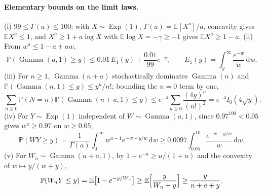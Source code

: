 \documentclass[11pt,a4paper]{article}
\theoremstyle{plain}
\theoremstyle{definition}
\theoremstyle{remark}
\newcommand{\Prob}{\mathbb P}
\newcommand{\E}{\mathbb E}
\newcommand{\dd}{\,\mathrm d}
\DeclareMathOperator{\Gam}{Gamma}
\DeclareMathOperator{\Ex}{Exp}
\begin{document}
\paragraph{Elementary bounds on the limit laws.} (i) $99\le\Gamma(a)\le100$: with $X\sim\Ex(1)$, $\Gamma(a)=\E[X^a]/a$, concavity gives $\E X^a\le1$, and $X^a\ge1+a\log X$ with $\E\log X=-\gamma\ge-1$ gives $\E X^a\ge1-a$. (ii) From $w^a\le1-a+aw$,
\begin{equation}\label{eq:blankup}
\Prob(\Gam(a,1)\ge y)\le0.01\,E_1(y)+\frac{0.01}{99}e^{-y},\qquad E_1(y)=\int_y^\infty\frac{e^{-w}}{w}\dd w.
\end{equation}
(iii) For $n\ge1$, $\Gam(n+a)$ stochastically dominates $\Gam(n)$ and $\Prob(\Gam(n,1)\le y)\le y^n/n!$; bounding the $n=0$ term by one,
\begin{equation}\label{eq:missup}
\sum_{n\ge0}\Prob(N=n)\Prob(\Gam(n+a,1)\le y)\le e^{-4}\sum_{n\ge0}\frac{(4y)^n}{(n!)^2}=e^{-4}I_0(4\sqrt y).
\end{equation}
(iv) For $Y\sim\Ex(1)$ independent of $W\sim\Gam(a,1)$, since $0.97^{100}<0.05$ gives $w^a\ge0.97$ on $w\ge0.05$,
\begin{equation}\label{eq:blanklow}
\Prob(WY\ge y)=\frac1{\Gamma(a)}\int_0^\infty w^{a-1}e^{-w-y/w}\dd w\ge0.0097\int_{0.05}^{10}\frac{e^{-w-y/w}}{w}\dd w.
\end{equation}
(v) For $W_n\sim\Gam(n+a,1)$, by $1-e^{-u}\ge u/(1+u)$ and the convexity of $w\mapsto y/(w+y)$,
\begin{equation}\label{eq:misslow}
\Prob(W_nY\le y)=\E\bigl[1-e^{-y/W_n}\bigr]\ge\E\Bigl[\frac{y}{W_n+y}\Bigr]\ge\frac{y}{n+a+y}.
\end{equation}
\end{document}
